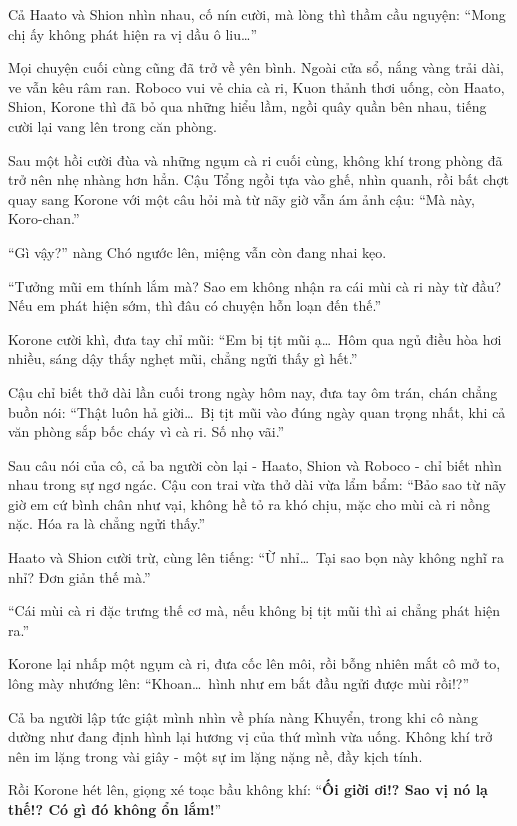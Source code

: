 \documentclass[../main.tex]{subfiles}
\begin{document}
Cả Haato và Shion nhìn nhau, cố nín cười, mà lòng thì thầm cầu nguyện: ``Mong chị ấy không phát hiện ra vị dầu ô liu\dots''

Mọi chuyện cuối cùng cũng đã trở về yên bình. Ngoài cửa sổ, nắng vàng trải dài, ve vẫn kêu râm ran. Roboco vui vẻ chia cà ri, Kuon thảnh thơi uống, còn Haato, Shion, Korone thì đã bỏ qua những hiểu lầm, ngồi quây quần bên nhau, tiếng cười lại vang lên trong căn phòng.

\ct

Sau một hồi cười đùa và những ngụm cà ri cuối cùng, không khí trong phòng đã trở nên nhẹ nhàng hơn hẳn. Cậu Tổng ngồi tựa vào ghế, nhìn quanh, rồi bất chợt quay sang Korone với một câu hỏi mà từ nãy giờ vẫn ám ảnh cậu: ``Mà này, Koro-chan.''

``Gì vậy?''  nàng Chó ngước lên, miệng vẫn còn đang nhai kẹo.

``Tưởng mũi em thính lắm mà? Sao em không nhận ra cái mùi cà ri này từ đầu? Nếu em phát hiện sớm, thì đâu có chuyện hỗn loạn đến thế.''

Korone cười khì, đưa tay chỉ mũi: ``Em bị tịt mũi ạ\dots\ Hôm qua ngủ điều hòa hơi nhiều, sáng dậy thấy nghẹt mũi, chẳng ngửi thấy gì hết.''

Cậu chỉ biết thở dài lần cuối trong ngày hôm nay, đưa tay ôm trán, chán chẳng buồn nói: ``Thật luôn hả giời\dots\ Bị tịt mũi vào đúng ngày quan trọng nhất, khi cả văn phòng sắp bốc cháy vì cà ri. Số nhọ vãi.''

Sau câu nói của cô, cả ba người còn lại - Haato, Shion và Roboco - chỉ biết nhìn nhau trong sự ngơ ngác. Cậu con trai vừa thở dài vừa lẩm bẩm: ``Bảo sao từ nãy giờ em cứ bình chân như vại, không hề tỏ ra khó chịu, mặc cho mùi cà ri nồng nặc. Hóa ra là chẳng ngửi thấy.''

Haato và Shion cười trừ, cùng lên tiếng: ``Ừ nhỉ\dots\ Tại sao bọn này không nghĩ ra nhỉ? Đơn giản thế mà.''

``Cái mùi cà ri đặc trưng thế cơ mà, nếu không bị tịt mũi thì ai chẳng phát hiện ra.''

Korone lại nhấp một ngụm cà ri, đưa cốc lên môi, rồi bỗng nhiên mắt cô mở to, lông mày nhướng lên: ``Khoan\dots\ hình như em bắt đầu ngửi được mùi rồi!?''

Cả ba người lập tức giật mình nhìn về phía nàng Khuyển, trong khi cô nàng dường như đang định hình lại hương vị của thứ mình vừa uống. Không khí trở nên im lặng trong vài giây - một sự im lặng nặng nề, đầy kịch tính.

Rồi Korone hét lên, giọng xé toạc bầu không khí: ``\textbf{Ối giời ơi!? Sao vị nó lạ thế!? Có gì đó không ổn lắm!}''
\end{document}
